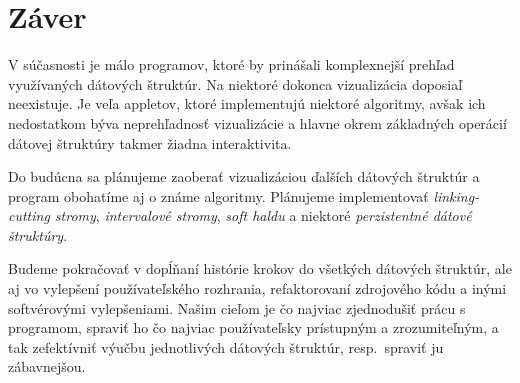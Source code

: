 \section{Záver}

V súčasnosti je málo programov, ktoré by prinášali komplexnejší prehľad 
využívaných dátových štruktúr. Na niektoré dokonca vizualizácia doposiaľ 
neexistuje. Je veľa appletov, ktoré implementujú niektoré algoritmy, avšak 
ich nedostatkom býva neprehľadnosť vizualizácie a hlavne okrem základných 
operácií dátovej štruktúry takmer žiadna interaktivita. 

Do budúcna sa plánujeme zaoberať vizualizáciou ďalších dátových 
štruktúr a program obohatíme aj o známe algoritmy. Plánujeme implementovať 
\emph{linking-cutting stromy}, \emph{intervalové stromy}, \emph{soft haldu} 
a niektoré \emph{perzistentné dátové štruktúry}.

Budeme pokračovať v dopĺňaní histórie krokov do všetkých dátových štruktúr, 
ale aj vo vylepšení používateľského rozhrania, refaktorovaní zdrojového kódu 
a inými softvérovými vylepšeniami. Našim cieľom je čo najviac zjednodušiť 
prácu s programom, spraviť ho čo najviac používateľsky prístupným a 
zrozumiteľným, a tak zefektívniť výučbu jednotlivých dátových štruktúr, 
resp.\ spraviť ju zábavnejšou.

